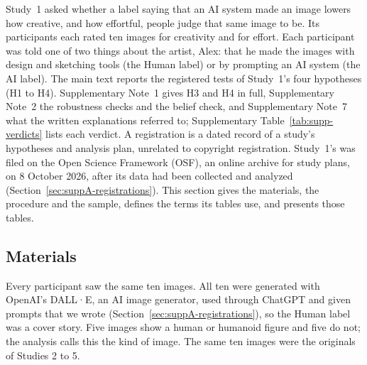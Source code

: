 \label{sec:suppA-study1}
\begingroup
\let\suppAtable\table
\renewcommand{\table}[1][]{\suppAtable[H]}

Study~1 asked whether a label saying that an AI system made an image lowers how creative, and how effortful, people judge that same image to be. Its \SOneN{} participants each rated ten images for creativity and for effort. Each participant was told one of two things about the artist, Alex: that he made the images with design and sketching tools (the Human label) or by prompting an AI system (the AI label). The main text reports the registered tests of Study~1's four hypotheses (H1 to H4). Supplementary Note~1 gives H3 and H4 in full, Supplementary Note~2 the robustness checks and the belief check, and Supplementary Note~7 what the written explanations referred to; Supplementary Table~\ref{tab:supp-verdicts} lists each verdict. A registration is a dated record of a study's hypotheses and analysis plan, unrelated to copyright registration. Study~1's was filed on the Open Science Framework (OSF), an online archive for study plans, on 8 October 2026, after its data had been collected and analyzed (Section~\ref{sec:suppA-registrations}). This section gives the materials, the procedure and the sample, defines the terms its tables use, and presents those tables.

\subsection*{Materials}

Every participant saw the same ten images. All ten were generated with OpenAI's DALL·E, an AI image generator, used through ChatGPT and given prompts that we wrote (Section~\ref{sec:suppA-registrations}), so the Human label was a cover story. Five images show a human or humanoid figure and five do not; the analysis calls this the kind of image. The same ten images were the originals of Studies 2 to 5.

